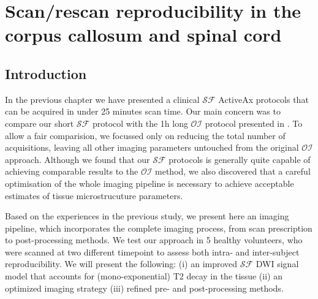 \newcommand{\SF}{{\ensuremath{\mathcal{SF}}}}
\newcommand{\OI}{{\ensuremath{\mathcal{OI}}}}
\newcommand{\SD}{{\ensuremath{\mathcal{SF}_{pulses}}}}
\newcommand{\DO}{{\ensuremath{\mathcal{SF}_{dirs}}}}
\newcommand{\FD}{{\SF}}
\newcommand{\FDmod}{{\ensuremath{\FD_{mod}}}}
\newcommand{\SFasym}{{\ensuremath{a\mathcal{SF}}}}

\newcommand{\SFshort}{\SF$_{90}$}
\newcommand{\SFlong}{\SF$_{360}$}
\newcommand{\OIlong}{\OI$_{360}$}


\newsavebox{\poorBox}
\savebox{\poorBox}{\textcolor{red}{\rule{0.05in}{0.05in}}}
\newsavebox{\fairBox}
\savebox{\fairBox}{\textcolor{orange}{\rule{0.05in}{0.05in}}}
\newsavebox{\moderateBox}
\savebox{\moderateBox}{\textcolor{yellow}{\rule{0.05in}{0.05in}}}
\newsavebox{\substantialBox}
\savebox{\substantialBox}{\textcolor{lime}{\rule{0.05in}{0.05in}}}
\newsavebox{\perfectBox}
\savebox{\perfectBox}{\textcolor{green}{\rule{0.05in}{0.05in}}}


\chapter[Scan/rescan in the corpus callosum]{Scan/rescan reproducibility in the corpus callosum and spinal cord}
\section{Introduction}
In the previous chapter we have presented a clinical {\SF} ActiveAx protocols that can be acquired in under 25 minutes scan time. Our main concern was to compare our short {\SF} protocol with the 1h long \OI{} protocol presented in \citep{Alexander:2010}. To allow a fair comparision, we focussed only on reducing the total number of acquisitions, leaving all other imaging parameters untouched from the original \OI{} approach. Although we found that our \SF{} protocols is generally quite capable of achieving comparable results to the \OI{} method, we also discovered that a careful optimisation of the whole imaging pipeline is necessary to achieve acceptable estimates of tissue microstrucuture parameters. 


Based on the experiences in the previous study, we present here an imaging pipeline, which incorporates the complete imaging process, from scan prescription to post-processing methods. We test our approach in 5 healthy volunteers, who were scanned at two different timepoint to assess both intra- and inter-subject reproducibility. We will present the following:  (i) an improved \SF{} DWI signal model that accounts for (mono-exponential) T2 decay in the tissue (ii) an optimized imaging strategy (iii) refined pre- and post-processing methods. 
